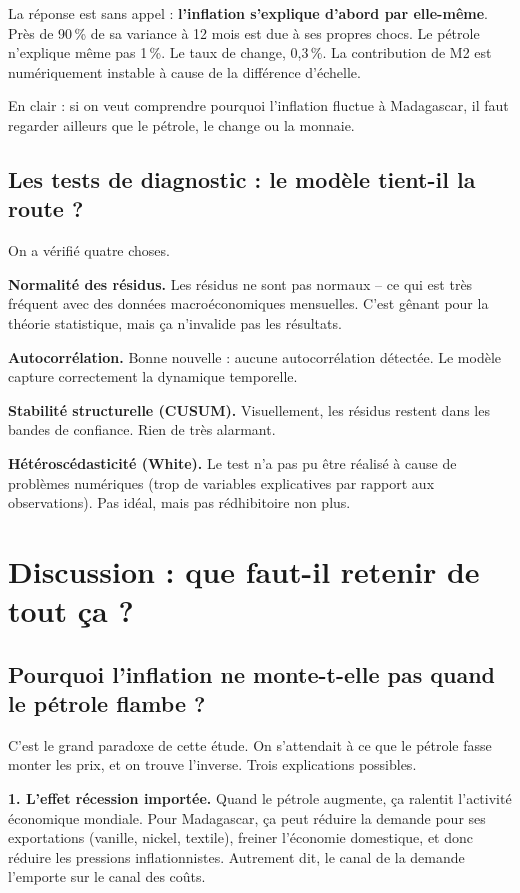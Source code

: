\documentclass[12pt,a4paper]{article}
\begin{document}
La réponse est sans appel : \textbf{l'inflation s'explique d'abord par elle-même}. Près de 90\,\% de sa variance à 12 mois est due à ses propres chocs. Le pétrole n'explique même pas 1\,\%. Le taux de change, 0,3\,\%. La contribution de M2 est numériquement instable à cause de la différence d'échelle.

En clair : si on veut comprendre pourquoi l'inflation fluctue à Madagascar, il faut regarder ailleurs que le pétrole, le change ou la monnaie.

\subsection{Les tests de diagnostic : le modèle tient-il la route ?}

On a vérifié quatre choses.

\textbf{Normalité des résidus.} Les résidus ne sont pas normaux -- ce qui est très fréquent avec des données macroéconomiques mensuelles. C'est gênant pour la théorie statistique, mais ça n'invalide pas les résultats.

\textbf{Autocorrélation.} Bonne nouvelle : aucune autocorrélation détectée. Le modèle capture correctement la dynamique temporelle.

\textbf{Stabilité structurelle (CUSUM).} Visuellement, les résidus restent dans les bandes de confiance. Rien de très alarmant.

\textbf{Hétéroscédasticité (White).} Le test n'a pas pu être réalisé à cause de problèmes numériques (trop de variables explicatives par rapport aux observations). Pas idéal, mais pas rédhibitoire non plus.

\section{Discussion : que faut-il retenir de tout ça ?}

\subsection{Pourquoi l'inflation ne monte-t-elle pas quand le pétrole flambe ?}

C'est le grand paradoxe de cette étude. On s'attendait à ce que le pétrole fasse monter les prix, et on trouve l'inverse. Trois explications possibles.

\textbf{1. L'effet récession importée.} Quand le pétrole augmente, ça ralentit l'activité économique mondiale. Pour Madagascar, ça peut réduire la demande pour ses exportations (vanille, nickel, textile), freiner l'économie domestique, et donc réduire les pressions inflationnistes. Autrement dit, le canal de la demande l'emporte sur le canal des coûts.
\end{document}
